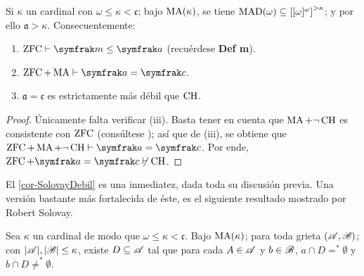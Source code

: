 \begin{corolario}\label{cor-MaSimple}
	Si $\kappa$ un cardinal con $\omega \leq \kappa <\mathfrak{c}$; bajo $\operatorname{MA}(\kappa)$, se tiene $\operatorname{MAD}(\omega) \subseteq \left[[\omega]^\omega\right]^{>\kappa}$; y por ello $\mathfrak{a}>\kappa$.
	Consecuentemente:
	\begin{enumerate}
		\item $\zfc \vdash \mathfrak{m} \leq \mathfrak{a}$ (recuérdese \textbf{Def m}).
		\item $\zfc + \Ma \vdash \mathfrak{a}=\mathfrak{c}$.
		\item $\mathfrak{a} = \mathfrak{c}$ es estrictamente más débil que $\operatorname{CH}$.
	\end{enumerate}
\end{corolario}

\begin{proof}
	Únicamente falta verificar (iii). Basta tener en cuenta que $\operatorname{MA} + \lnot \operatorname{CH}$ es consistente con $\operatorname{ZFC}$ (consúltese \cite[p.~279-281]{kunenSet}); así que de (iii), se obtiene que $\zfc + \Ma + \lnot \HC \vdash \mathfrak{a}=\mathfrak{c}$. Por ende, $\zfc + \mathfrak{a}=\mathfrak{c} \not\vdash \HC$.
\end{proof}

El \autoref{cor-SolovayDebil} es una inmediatez, dada toda su discusión previa. Una versión bastante más fortalecida de éste, es el siguiente resultado mostrado por Robert Solovay.

\begin{lema}[Solovay]\label{lem-Solovay}
	Sea $\kappa$ un cardinal de modo que $\omega \leq \kappa < \mathfrak{c}$. Bajo $\operatorname{MA}(\kappa)$; para toda grieta $(\mathscr{A},\mathscr{B})$; con $|\mathscr{A}|,|\mathscr{B}|\leq \kappa$, existe $D\subseteq \mathscr{A}$ tal que para cada $A \in \mathscr{A}$ y $b \in \mathscr{B}$, $a \cap D=^*\emptyset$ y $b \cap D\neq ^*\emptyset$.
\end{lema}

